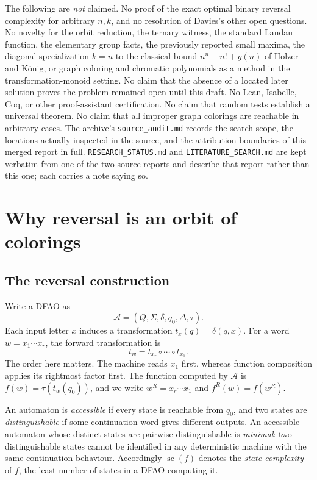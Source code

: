 \documentclass[11pt,a4paper]{article}
\numberwithin{equation}{section}
\theoremstyle{definition}
\theoremstyle{remark}
\newcommand{\D}{\Delta}
\newcommand{\statecomplex}{\operatorname{sc}}
\begin{document}
The following are \emph{not} claimed. No proof of the exact optimal binary
reversal complexity for arbitrary $n,k$, and no resolution of Davies's other
open questions. No novelty for the orbit reduction, the ternary witness, the
standard Landau function, the elementary group facts, the previously
reported small maxima, the diagonal specialization $k=n$ to the classical
bound $n^n-n!+g(n)$ of Holzer and K\"onig, or graph coloring and chromatic
polynomials as a method in the transformation-monoid setting. No claim that
the absence of a located later solution proves the problem remained open
until this draft. No Lean, Isabelle, Coq, or other proof-assistant
certification. No claim that random tests establish a universal theorem.
No claim that all improper graph colorings are reachable in arbitrary cases.
The archive's \texttt{source\_audit.md} records the search scope, the locations
actually inspected in the source, and the attribution boundaries of this merged
report in full. \texttt{RESEARCH\_STATUS.md} and \texttt{LITERATURE\_SEARCH.md}
are kept verbatim from one of the two source reports and describe that report
rather than this one; each carries a note saying so.

\section{Why reversal is an orbit of colorings}\label{sec:orbit}

\subsection{The reversal construction}

Write a DFAO as
\[
 \mathcal A=(Q,\Sigma,\delta,q_0,\D,\tau).
\]
Each input letter $x$ induces a transformation $t_x(q)=\delta(q,x)$.
For a word $w=x_1\cdots x_r$, the forward transformation is
\[
 t_w=t_{x_r}\circ\cdots\circ t_{x_1}.
\]
The order here matters. The machine reads $x_1$ first, whereas function
composition applies its rightmost factor first. The function computed by
$\mathcal A$ is $f(w)=\tau(t_w(q_0))$, and we write $w^R=x_r\cdots x_1$ and
$f^R(w)=f(w^R)$.

An automaton is \emph{accessible} if every state is reachable from $q_0$, and
two states are \emph{distinguishable} if some continuation word gives
different outputs. An accessible automaton whose distinct states are pairwise
distinguishable is \emph{minimal}: two distinguishable states cannot be
identified in any deterministic machine with the same continuation behaviour.
Accordingly $\statecomplex(f)$ denotes the \emph{state complexity} of $f$, the
least number of states in a DFAO computing it.
\end{document}
